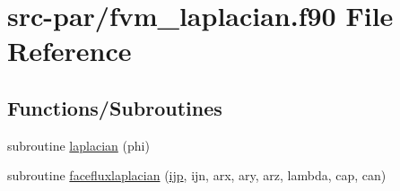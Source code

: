 \hypertarget{fvm__laplacian_8f90}{\section{src-\/par/fvm\-\_\-laplacian.f90 File Reference}
\label{fvm__laplacian_8f90}
}
\subsection*{Functions/\-Subroutines}
\begin{DoxyCompactItemize}
\item 
subroutine \hyperlink{fvm__laplacian_8f90_a10d8a4a81e51e8e8705367898230f542}{laplacian} (phi)
\item 
subroutine \hyperlink{fvm__laplacian_8f90_acf11c69b78043642b6129d71faea69da}{facefluxlaplacian} (\hyperlink{CourantNo_8h_accea320a458bb8759c7ece360e05ddf4}{ijp}, ijn, arx, ary, arz, lambda, cap, can)
\end{DoxyCompactItemize}


